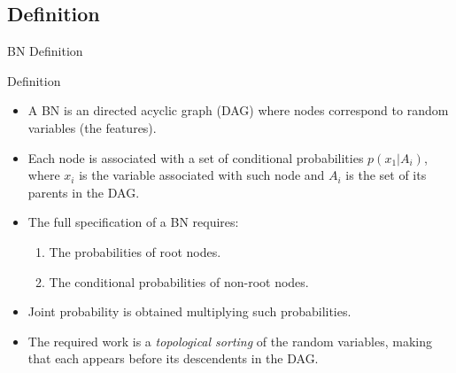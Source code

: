 \documentclass[xcolor=x11names,compress]{beamer}
\renewcommand{\(}{\begin{columns}}
\renewcommand{\)}{\end{columns}}
\newcommand{\<}[1]{\begin{column}{#1}}
\renewcommand{\>}{\end{column}}
\begin{document}
\subsection{Definition}
\begin{frame}{BN Definition}
\begin{block}{Definition}
\begin{itemize}
	\item A BN is an directed acyclic graph (DAG) where nodes correspond to random variables (the features).
	\item Each node is associated with a set of conditional probabilities $p(x_1 | A_i)$, where $x_i$ is the variable associated with such node and $A_i$ is the set of its parents in the DAG.
	\item The full specification of a BN requires:
	\begin{enumerate}
		\item The probabilities of root nodes.
		\item The conditional probabilities  of non-root nodes.
	\end{enumerate}
	\item Joint probability is obtained multiplying such probabilities.
	\item The required work is a \emph{topological sorting} of the random variables, making that each appears before its descendents in the DAG.
\end{itemize}
\end{block}
\end{frame}
\end{document}
